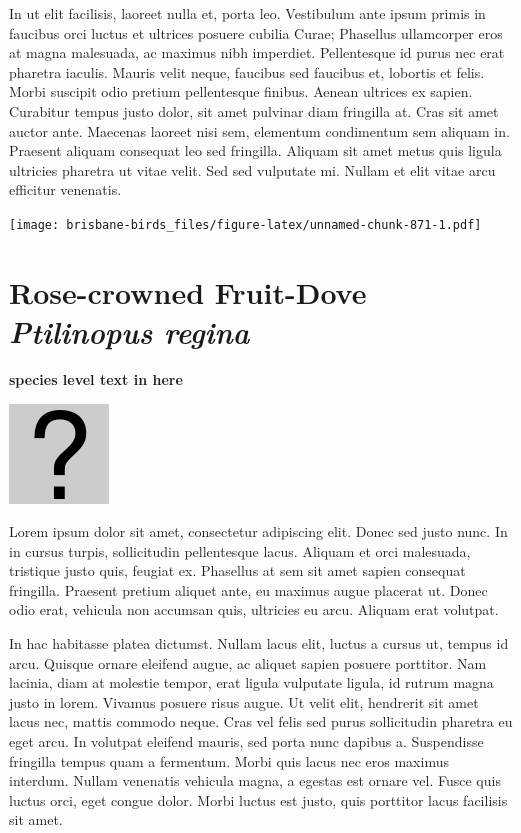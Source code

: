 \documentclass[]{book}
\let\origfigure\figure
\let\endorigfigure\endfigure
\renewenvironment{figure}[1][2] {
  \expandafter\origfigure\expandafter[H]
} {
  \endorigfigure
}
\begin{document}
In ut elit facilisis, laoreet nulla et, porta leo. Vestibulum ante ipsum
primis in faucibus orci luctus et ultrices posuere cubilia Curae;
Phasellus ullamcorper eros at magna malesuada, ac maximus nibh
imperdiet. Pellentesque id purus nec erat pharetra iaculis. Mauris velit
neque, faucibus sed faucibus et, lobortis et felis. Morbi suscipit odio
pretium pellentesque finibus. Aenean ultrices ex sapien. Curabitur
tempus justo dolor, sit amet pulvinar diam fringilla at. Cras sit amet
auctor ante. Maecenas laoreet nisi sem, elementum condimentum sem
aliquam in. Praesent aliquam consequat leo sed fringilla. Aliquam sit
amet metus quis ligula ultricies pharetra ut vitae velit. Sed sed
vulputate mi. Nullam et elit vitae arcu efficitur venenatis.

\begin{figure}
\centering
\texttt{[image: brisbane-birds\_files/figure-latex/unnamed-chunk-871-1.pdf]}
\caption{\label{fig:unnamed-chunk-871}insert figure caption}
\end{figure}

\section{\texorpdfstring{Rose-crowned Fruit-Dove \emph{Ptilinopus
regina}}{Rose-crowned Fruit-Dove Ptilinopus regina}}\label{rose-crowned-fruit-dove-ptilinopus-regina}

\textbf{species level text in here}

\begin{figure}
\centering
\includegraphics{assets/missing.png}
\caption{No image for species}
\end{figure}

Lorem ipsum dolor sit amet, consectetur adipiscing elit. Donec sed justo
nunc. In in cursus turpis, sollicitudin pellentesque lacus. Aliquam et
orci malesuada, tristique justo quis, feugiat ex. Phasellus at sem sit
amet sapien consequat fringilla. Praesent pretium aliquet ante, eu
maximus augue placerat ut. Donec odio erat, vehicula non accumsan quis,
ultricies eu arcu. Aliquam erat volutpat.

In hac habitasse platea dictumst. Nullam lacus elit, luctus a cursus ut,
tempus id arcu. Quisque ornare eleifend augue, ac aliquet sapien posuere
porttitor. Nam lacinia, diam at molestie tempor, erat ligula vulputate
ligula, id rutrum magna justo in lorem. Vivamus posuere risus augue. Ut
velit elit, hendrerit sit amet lacus nec, mattis commodo neque. Cras vel
felis sed purus sollicitudin pharetra eu eget arcu. In volutpat eleifend
mauris, sed porta nunc dapibus a. Suspendisse fringilla tempus quam a
fermentum. Morbi quis lacus nec eros maximus interdum. Nullam venenatis
vehicula magna, a egestas est ornare vel. Fusce quis luctus orci, eget
congue dolor. Morbi luctus est justo, quis porttitor lacus facilisis sit
amet.
\end{document}

